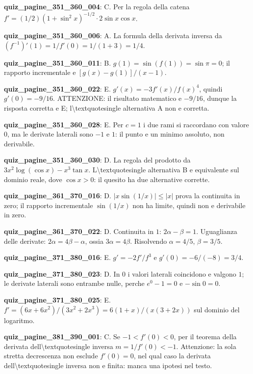 \documentclass[11pt,a4paper]{article}
\newcounter{quiz}
\begin{document}
\noindent\textbf{quiz\_pagine\_351\_360\_004}: C. Per la regola della catena $f\prime=(1/2)(1+\sin^2x)^{-1/2}\cdot2\sin x\cos x$.\par\medskip
\noindent\textbf{quiz\_pagine\_351\_360\_006}: A. La formula della derivata inversa da $(f^{-1})\prime(1)=1/f\prime(0)=1/(1+3)=1/4$.\par\medskip
\noindent\textbf{quiz\_pagine\_351\_360\_011}: B. $g(1)=\sin(f(1))=\sin\pi=0$; il rapporto incrementale e $[g(x)-g(1)]/(x-1)$.\par\medskip
\noindent\textbf{quiz\_pagine\_351\_360\_022}: E. $g\prime(x)=-3f\prime(x)/f(x)^4$, quindi $g\prime(0)=-9/16$. ATTENZIONE: il risultato matematico e $-9/16$, dunque la risposta corretta e E; l\textbackslash{}textquotesingle alternativa A non e corretta.\par\medskip
\noindent\textbf{quiz\_pagine\_351\_360\_028}: E. Per $c=1$ i due rami si raccordano con valore $0$, ma le derivate laterali sono $-1$ e $1$: il punto e un minimo assoluto, non derivabile.\par\medskip
\noindent\textbf{quiz\_pagine\_351\_360\_030}: D. La regola del prodotto da $3x^2\log(\cos x)-x^3\tan x$. L\textbackslash{}textquotesingle alternativa B e equivalente sul dominio reale, dove $\cos x>0$: il quesito ha due alternative corrette.\par\medskip
\noindent\textbf{quiz\_pagine\_361\_370\_016}: D. $|x\sin(1/x)|\leq|x|$ prova la continuita in zero; il rapporto incrementale $\sin(1/x)$ non ha limite, quindi non e derivabile in zero.\par\medskip
\noindent\textbf{quiz\_pagine\_361\_370\_022}: D. Continuita in $1$: $2\alpha-\beta=1$. Uguaglianza delle derivate: $2\alpha=4\beta-\alpha$, ossia $3\alpha=4\beta$. Risolvendo $\alpha=4/5$, $\beta=3/5$.\par\medskip
\noindent\textbf{quiz\_pagine\_371\_380\_016}: E. $g\prime=-2f\prime/f^3$ e $g\prime(0)=-6/(-8)=3/4$.\par\medskip
\noindent\textbf{quiz\_pagine\_371\_380\_023}: D. In $0$ i valori laterali coincidono e valgono $1$; le derivate laterali sono entrambe nulle, perche $e^0-1=0$ e $-\sin0=0$.\par\medskip
\noindent\textbf{quiz\_pagine\_371\_380\_025}: E. $f\prime=(6x+6x^2)/(3x^2+2x^3)=6(1+x)/(x(3+2x))$ sul dominio del logaritmo.\par\medskip
\noindent\textbf{quiz\_pagine\_381\_390\_001}: C. Se $-1<f\prime(0)<0$, per il teorema della derivata dell\textbackslash{}textquotesingle inversa $m=1/f\prime(0)<-1$. Attenzione: la sola stretta decrescenza non esclude $f\prime(0)=0$, nel qual caso la derivata dell\textbackslash{}textquotesingle inversa non e finita: manca una ipotesi nel testo.\par\medskip
\end{document}
